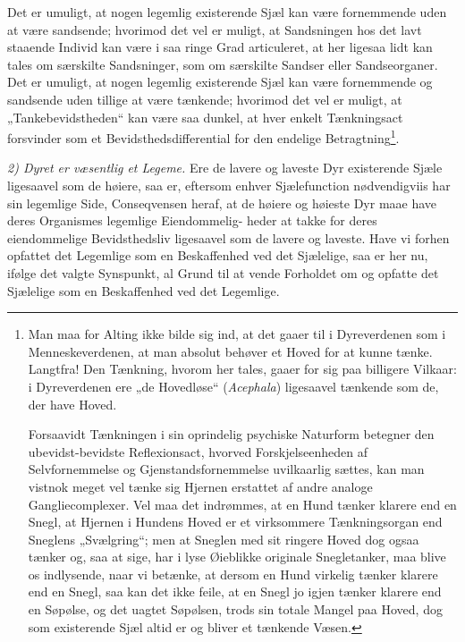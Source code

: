 \documentclass[12pt,a4paper]{book}
\begin{document}
\setcounter{footnote}{0}
Det er umuligt, at nogen legemlig existerende Sjæl kan være fornemmende uden at
være sandsende; hvorimod det vel er muligt, at Sandsningen hos det lavt staaende
Individ kan være i saa ringe Grad articuleret, at her ligesaa lidt kan tales om
særskilte Sandsninger, som om særskilte Sandser eller Sandseorganer. Det er
umuligt, at nogen legemlig existerende Sjæl kan være fornemmende og sandsende
uden tillige at være tænkende; hvorimod det vel er muligt, at „Tankebevidstheden“
kan være saa dunkel, at hver enkelt Tænkningsact forsvinder som et
Bevidsthedsdifferential for den endelige Betragtning\footnote{Man maa for Alting
ikke bilde sig ind, at det gaaer til i Dyreverdenen som i Menneskeverdenen, at
man absolut behøver et Hoved for at kunne tænke. Langtfra! Den Tænkning, hvorom
her tales, gaaer for sig paa billigere Vilkaar: i Dyreverdenen ere „de
Hovedløse“ (\textit{Acephala}) ligesaavel tænkende som de, der have Hoved.
\par Forsaavidt Tænkningen i sin oprindelig psychiske Naturform betegner den
ubevidst-bevidste Reflexionsact, hvorved Forskjelseenheden af Selvfornemmelse og
Gjenstandsfornemmelse uvilkaarlig sættes, kan man vistnok meget vel tænke sig
Hjernen erstattet af andre analoge Gangliecomplexer. Vel maa det indrømmes, at
en Hund tænker klarere end en Snegl, at Hjernen i Hundens Hoved er et
virksommere Tænkningsorgan end Sneglens „Svælgring“; men at Sneglen med sit
ringere Hoved dog ogsaa tænker og, saa at sige, har i lyse Øieblikke originale
Snegletanker, maa blive os indlysende, naar vi betænke, at dersom en Hund
virkelig tænker klarere end en Snegl, saa kan det ikke feile, at en Snegl jo
igjen tænker klarere end en Søpølse, og det uagtet Søpølsen, trods sin totale
Mangel paa Hoved, dog som existerende Sjæl altid er og bliver et tænkende
Væsen.}.

\emph{2) Dyret er væsentlig et Legeme.} Ere de lavere og laveste Dyr existerende
Sjæle ligesaavel som de høiere, saa er, eftersom enhver Sjælefunction
nødvendigviis har sin legemlige Side, Conseqvensen heraf, at de høiere og
høieste Dyr maae have deres Organismes legemlige Eiendommelig-
heder at takke for deres eiendommelige Bevidsthedsliv ligesaavel som de lavere
og laveste. Have vi forhen opfattet det Legemlige som en Beskaffenhed ved det
Sjælelige, saa er her nu, ifølge det valgte Synspunkt, al Grund til at vende
Forholdet om og opfatte det Sjælelige som en Beskaffenhed ved det Legemlige.
\end{document}
